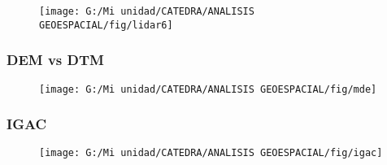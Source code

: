 \documentclass[14pt]{beamer}
\begin{document}
\begin{frame} 
 \begin{figure}
    \centering
    \texttt{[image: G:/Mi unidad/CATEDRA/ANALISIS GEOESPACIAL/fig/lidar6]}
  \end{figure}
\end{frame}
\begin{frame}
\frametitle{DEM vs DTM}
 \begin{figure}
    \centering
    \texttt{[image: G:/Mi unidad/CATEDRA/ANALISIS GEOESPACIAL/fig/mde]}
  \end{figure}
\end{frame}
\begin{frame}
\frametitle{IGAC}
 \begin{figure}
    \centering
    \texttt{[image: G:/Mi unidad/CATEDRA/ANALISIS GEOESPACIAL/fig/igac]}
  \end{figure}
\end{frame}
\end{document}
